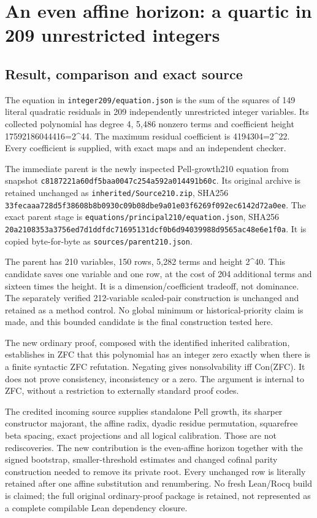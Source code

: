 \section{An even affine horizon: a quartic in 209 unrestricted
integers}\label{an-even-affine-horizon-a-quartic-in-209-unrestricted-integers}

\subsection{Result, comparison and exact
source}\label{result-comparison-and-exact-source}

The equation in \nolinkurl{integer209/equation.json} is the sum of the
squares of 149 literal quadratic residuals in 209 independently
unrestricted integer variables. Its collected polynomial has degree 4,
5,486 nonzero terms and coefficient height 17592186044416=2\^{}44. The
maximum residual coefficient is 4194304=2\^{}22. Every coefficient is
supplied, with exact maps and an independent checker.

The immediate parent is the newly inspected Pell-growth210 equation from
snapshot \nolinkurl{c8187221a60df5baa0047c254a592a014491b60c}. Its original archive
is retained unchanged as \nolinkurl{inherited/Source210.zip}, SHA256
\nolinkurl{33fecaaa728d5f38608b8b0930c09b08dbe9a01e03f6269f092ec6142d72a0ee}. The
exact parent stage is \nolinkurl{equations/principal210/equation.json},
SHA256 \nolinkurl{20a2108353a3756ed7d1ddfdc71695131dcf0b6d94039988d9565ac48e6e1f0a}.
It is copied byte-for-byte as \nolinkurl{sources/parent210.json}.

The parent has 210 variables, 150 rows, 5,282 terms and height 2\^{}40.
This candidate saves one variable and one row, at the cost of 204
additional terms and sixteen times the height. It is a
dimension/coefficient tradeoff, not dominance. The separately verified
212-variable scaled-pair construction is unchanged and retained as a
method control. No global minimum or historical-priority claim is made,
and this bounded candidate is the final construction tested here.

The new ordinary proof, composed with the identified inherited
calibration, establishes in ZFC that this polynomial has an integer zero
exactly when there is a finite syntactic ZFC refutation. Negating gives
nonsolvability iff Con(ZFC). It does not prove consistency,
inconsistency or a zero. The argument is internal to ZFC, without a
restriction to externally standard proof codes.

The credited incoming source supplies standalone Pell growth, its
sharper constructor majorant, the affine radix, dyadic residue
permutation, squarefree beta spacing, exact projections and all logical
calibration. Those are not rediscoveries. The new contribution is the
even-affine horizon together with the signed bootstrap,
smaller-threshold estimates and changed cofinal parity construction
needed to remove its private root. Every unchanged row is literally
retained after one affine substitution and renumbering. No fresh
Lean/Rocq build is claimed; the full original ordinary-proof package is
retained, not represented as a complete compilable Lean dependency
closure.

